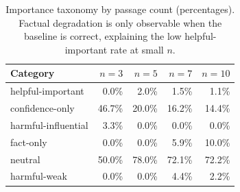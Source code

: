 \begin{table}[h]
\centering\small
\begin{tabular}{lrrrr}
\toprule
Category & $n=3$ & $n=5$ & $n=7$ & $n=10$ \\
\midrule
  helpful-important & 0.0\% & 2.0\% & 1.5\% & 1.1\% \\
  confidence-only & 46.7\% & 20.0\% & 16.2\% & 14.4\% \\
  harmful-influential & 3.3\% & 0.0\% & 0.0\% & 0.0\% \\
  fact-only & 0.0\% & 0.0\% & 5.9\% & 10.0\% \\
  neutral & 50.0\% & 78.0\% & 72.1\% & 72.2\% \\
  harmful-weak & 0.0\% & 0.0\% & 4.4\% & 2.2\% \\
\bottomrule
\end{tabular}
\caption{Importance taxonomy by passage count (percentages). Factual degradation is only observable when the baseline is correct, explaining the low helpful-important rate at small $n$.}
\label{tab:e2_taxonomy_by_passage_num}
\end{table}

